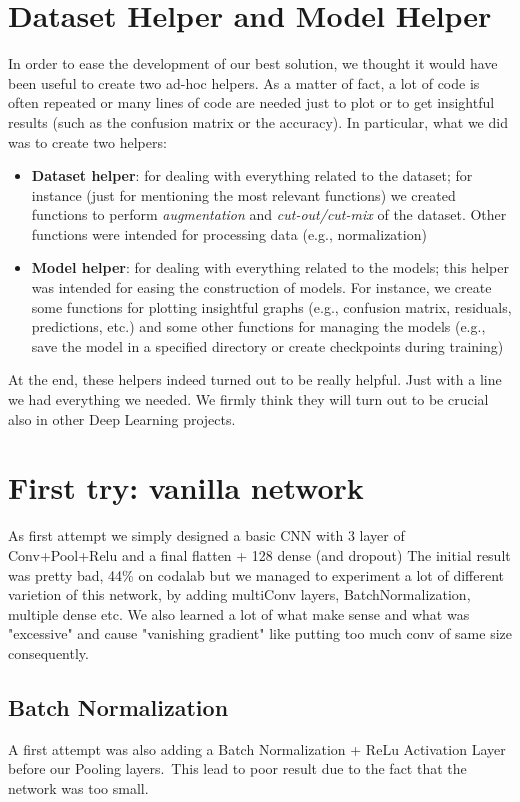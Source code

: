 \documentclass[10pt]{article}
\begin{document}
\section{Dataset Helper and Model Helper}
In order to ease the development of our best solution, we thought it would have been useful to create two ad-hoc helpers. As a matter of fact, a lot of code is often repeated or many lines of code are needed just to plot or to get insightful results (such as the confusion matrix or the accuracy). In particular, what we did was to create two helpers:
\begin{itemize}
    \item \textbf{Dataset helper}: for dealing with everything related to the dataset; for instance (just for mentioning the most relevant functions) we created functions to perform \textit{augmentation} and \textit{cut-out/cut-mix} of the dataset. Other functions were intended for processing data (e.g., normalization)
    \item \textbf{Model helper}: for dealing with everything related to the models; this helper was intended for easing the construction of models. For instance, we create some functions for plotting insightful graphs (e.g., confusion matrix, residuals, predictions, etc.) and some other functions for managing the models (e.g., save the model in a specified directory or create checkpoints during training)
\end{itemize}
At the end, these helpers indeed turned out to be really helpful. Just with a line we had everything we needed. We firmly think they will turn out to be crucial also in other Deep Learning projects.

\section{First try: vanilla network}
As first attempt we simply designed a basic CNN with 3 layer of Conv+Pool+Relu and a final flatten + 128 dense (and dropout)
The initial result was pretty bad, 44\% on codalab but we managed to experiment a lot of different varietion of this network, by adding multiConv layers, BatchNormalization, multiple dense etc.
We also learned a lot of what make sense and what was "excessive" and cause "vanishing gradient" like putting too much conv of same size consequently.
\subsection{Batch Normalization}
A first attempt was also adding a Batch Normalization + ReLu Activation Layer before our Pooling layers.\
This lead to poor result due to the fact that the network was too small.
\end{document}
